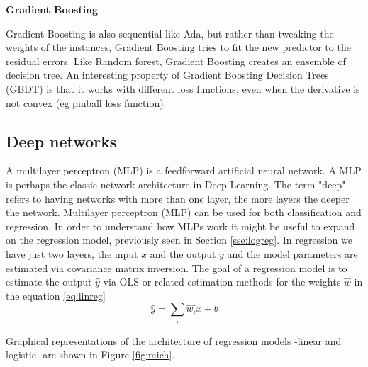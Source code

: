 \documentclass[11pt]{article}
\theoremstyle{definition}
\theoremstyle{remark}
\begin{document}
\textbf{Gradient Boosting}

Gradient Boosting is also sequential like Ada, but rather than tweaking the weights of the instances, Gradient Boosting tries to fit the new predictor to the residual errors.
Like Random forest, Gradient Boosting creates an ensemble of decision tree. An interesting property of Gradient Boosting Decision Trees (GBDT) is that it works with different loss functions, even when the derivative is not convex (eg pinball loss function). 

\subsection{Deep networks}
\label{se:deep}

A multilayer perceptron (MLP) is a feedforward artificial neural network. A MLP is perhaps the classic network architecture in Deep Learning. The term "deep" refers to having networks with more than one layer, the more layers the deeper the network.
Multilayer perceptron (MLP) can be used for both classification and regression. In order to understand how MLPs work it might be useful to expand on the regression model, previously seen in Section \ref{sse:logreg}. In regression we have just two layers, the input $x$ and the output $y$ and the model parameters are estimated via covariance matrix inversion. The goal of a regression model is to estimate the output $\hat{y}$ via OLS or related estimation methods for the weights $\hat{w}$ in the equation \ref{eq:linreg}
\begin{equation}
\hat{y} = \sum_i \hat{w_i} x + b
\label{eq:linreg}
\end{equation}
 
Graphical representations of the architecture of regression models -linear and logistic- are shown in Figure \ref{fig:mich}. 
\end{document}
